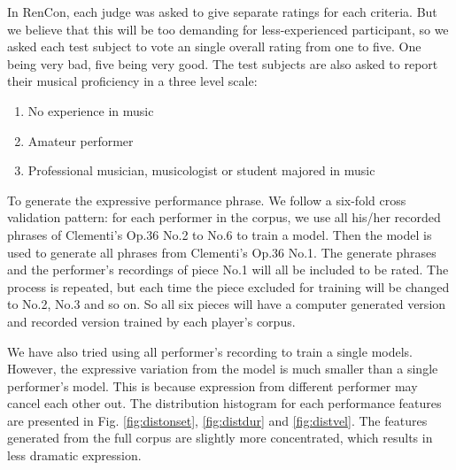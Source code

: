 In RenCon, each judge was asked to give separate ratings for each criteria. But we believe that this will be too demanding for less-experienced participant, so we asked each test subject to vote an single overall rating from one to five. One being very bad, five being very good. The test subjects are also asked to report their musical proficiency in a three level scale:
\begin{enumerate}
   \item No experience in music 
   \item Amateur performer
   \item Professional musician, musicologist or student majored in music
\end{enumerate}

To generate the expressive performance phrase. We follow a six-fold cross validation pattern: for each performer in the corpus, we use all his/her recorded phrases of Clementi's Op.36 No.2 to No.6 to train a model. Then the model is used to generate all phrases from Clementi's Op.36 No.1. The generate phrases and the performer's recordings of piece No.1 will all be included to be rated. The process is repeated, but each time the piece excluded for training will be changed to No.2, No.3 and so on. So all six pieces will have a computer generated version and recorded version trained by each player's corpus.


We have also tried using all performer's recording to train a single models. However, the expressive variation from the model is much smaller than a single performer's model. This is because expression from different performer may cancel each other out. The distribution histogram for each performance features are presented in Fig. \ref{fig:distonset}, \ref{fig:distdur} and \ref{fig:distvel}. The features generated from the full corpus are slightly more concentrated, which results in less dramatic expression.


